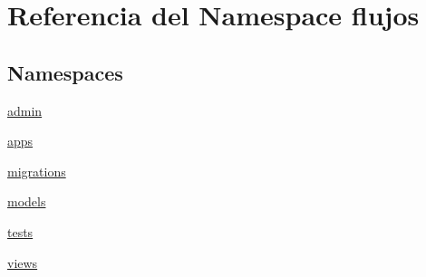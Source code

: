 \hypertarget{namespaceflujos}{}\section{Referencia del Namespace flujos}
\label{namespaceflujos}
\subsection*{Namespaces}
\begin{DoxyCompactItemize}
\item 
 \hyperlink{namespaceflujos_1_1admin}{admin}
\item 
 \hyperlink{namespaceflujos_1_1apps}{apps}
\item 
 \hyperlink{namespaceflujos_1_1migrations}{migrations}
\item 
 \hyperlink{namespaceflujos_1_1models}{models}
\item 
 \hyperlink{namespaceflujos_1_1tests}{tests}
\item 
 \hyperlink{namespaceflujos_1_1views}{views}
\end{DoxyCompactItemize}
